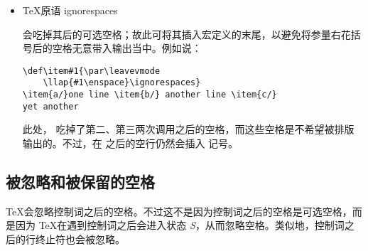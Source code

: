 \documentclass{book}
\begin{document}
\begin{itemize}
\item \TeX 原语 \csterm ignorespaces\par 会吃掉其后的可选空格；故此可将其插入宏定义的末尾，以避免将参量右花括号后的空格无意带入输出当中。例如说：
\begin{verbatim}
\def\item#1{\par\leavevmode
    \llap{#1\enspace}\ignorespaces}
\item{a/}one line \item{b/} another line \item{c/}
yet another
\end{verbatim}
此处， 吃掉了第二、第三两次调用之后的空格，而这些空格是不希望被排版输出的。不过，在  之后的空行仍然会插入  记号。
\end{itemize}

\subsection{被忽略和被保留的空格}

\TeX 会忽略控制词之后的空格。不过这不是因为控制词之后的空格是可选空格，而是因为 \TeX 在遇到控制词之后会进入状态 {\itshape S}，从而忽略空格。类似地，控制词之后的行终止符也会被忽略。
\end{document}
